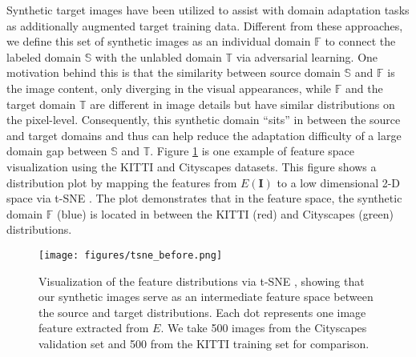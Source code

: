 \documentclass[10pt,twocolumn,letterpaper]{article}
\begin{document}
Synthetic target images have been utilized to assist with domain adaptation tasks \cite{bousmalis2017unsupervised, huang2018auggan, Inoue_2018_CVPR} as additionally augmented target training data.
Different from these approaches, we define this set of synthetic images as an individual domain $\mathbb{F}$ to connect the labeled domain $\mathbb{S}$ with the unlabled domain $\mathbb{T}$ via adversarial learning.
One motivation behind this is that the similarity between source domain $\mathbb{S}$ and $\mathbb{F}$ is the image content, only diverging in the visual appearances, while $\mathbb{F}$ and the target domain $\mathbb{T}$ are different in image details but have similar distributions on the pixel-level.
Consequently, this synthetic domain ``sits'' in between the source and target domains and thus can help reduce the adaptation difficulty of a large domain gap between $\mathbb{S}$ and $\mathbb{T}$.
Figure \ref{fig:tsne_before} is one example of feature space visualization using the KITTI and Cityscapes datasets.
This figure shows a distribution plot by mapping the features from $E(\mathbf{I})$ to a low dimensional 2-D space via t-SNE \cite{vanDerMaaten2008}.
The plot demonstrates that in the feature space, the synthetic domain $\mathbb{F}$ (blue) is located in between the KITTI (red) and Cityscapes (green) distributions.
\begin{figure}
		\begin{center}
        \texttt{[image: figures/tsne\_before.png]}
		\end{center}
		\caption{
        Visualization of the feature distributions via t-SNE \cite{vanDerMaaten2008}, showing that our synthetic images serve as an intermediate feature space between the source and target distributions.
Each dot represents one image feature extracted from $E$.
We take 500 images from the Cityscapes validation set and 500 from the KITTI training set for comparison.
}
		\label{fig:tsne_before}
\vspace{-3mm}
\end{figure}
\end{document}
